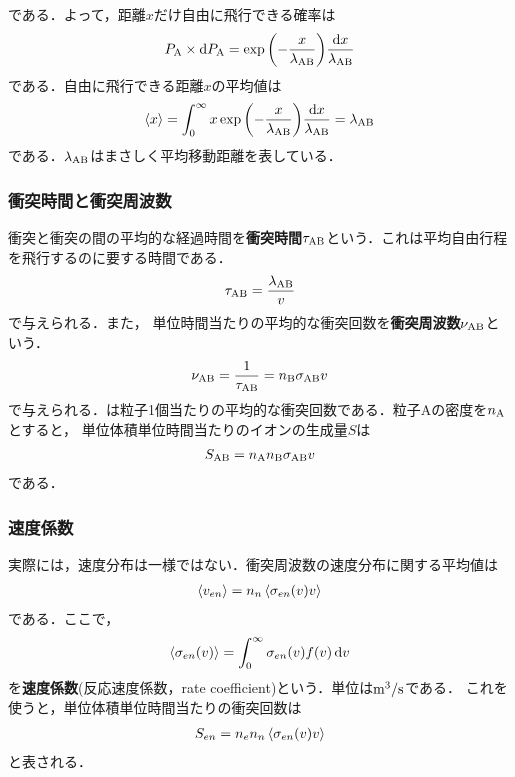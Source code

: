 \documentclass{report}
\begin{document}
        である．よって，距離$x$だけ自由に飛行できる確率は
        \begin{align}
          P_{\mathrm{A}}\times\dd{P_{\mathrm{A}}} = \exp\qty(-\frac{x}{\lambda_{\mathrm{AB}}})\frac{\dd{x}}{\lambda_{\mathrm{AB}}}
        \end{align}
        である．自由に飛行できる距離$x$の平均値は
        \begin{align}
          \ev{x} = \int_0^{\infty} x\exp\qty(-\frac{x}{\lambda_{\r{AB}}})\frac{\dd{x}}{\lambda_{\r{AB}}} = \lambda_{\r{AB}}
        \end{align}
        である．$\lambda_{\mathrm{AB}}$はまさしく平均移動距離を表している．
      \subsubsection{衝突時間と衝突周波数}
        衝突と衝突の間の平均的な経過時間を\textbf{衝突時間}$\tau_{\mathrm{AB}}$という．これは平均自由行程を飛行するのに要する時間である．
        \begin{align}
          \tau_{\mathrm{AB}} = \frac{\lambda_{\mathrm{AB}}}{v} \label{eq:collision_time}
        \end{align}
        で与えられる．また，
        単位時間当たりの平均的な衝突回数を\textbf{衝突周波数}$\nu_{\mathrm{AB}}$という．
        \begin{align}
          \nu_{\mathrm{AB}} = \frac{1}{\tau_{\mathrm{AB}}} = n_{\mathrm{B}} \sigma_{\mathrm{AB}} v \label{eq:collision_frequency}
        \end{align}
        で与えられる．は粒子1個当たりの平均的な衝突回数である．粒子Aの密度を$n_{\mathrm{A}}$とすると，
        単位体積単位時間当たりのイオンの生成量$S$は
        \begin{align}
          S_{\mathrm{AB}} = n_{\mathrm{A}} n_{\mathrm{B}} \sigma_{\mathrm{AB}} v
        \end{align}
        である．
      \subsubsection{速度係数}
        実際には，速度分布は一様ではない．衝突周波数の速度分布に関する平均値は
        \begin{align}
          \ev{v_{en}} = n_n \ev{\sigma_{en}(v)v}
        \end{align}
        である．ここで，
        \begin{align}
          \ev{\sigma_{en}(v)} = \int_0^{\infty} \sigma_{en}(v)f(v)\dd{v}
        \end{align}
        を\textbf{速度係数}(反応速度係数，rate coefficient)という．単位は$\mathrm{m^3/s}$である．
        これを使うと，単位体積単位時間当たりの衝突回数は
        \begin{align}
          S_{en} = n_e n_n \ev{\sigma_{en}(v)v}
        \end{align}
        と表される．
\end{document}
